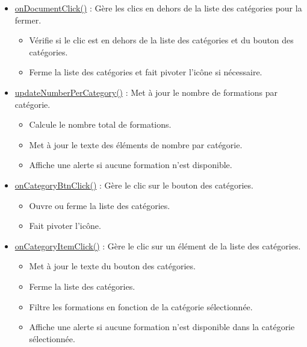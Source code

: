 \documentclass[a4paper,11pt]{article}
\begin{document}
\begin{enumerate}
\begin{enumerate}
\begin{itemize}
                                \item \underline{onDocumentClick()} : Gère les clics en dehors de la liste des catégories pour la fermer.
                                    \begin{itemize}
                                        \item Vérifie si le clic est en dehors de la liste des catégories et du bouton des catégories.
                                        \item Ferme la liste des catégories et fait pivoter l'icône si nécessaire.
                                    \end{itemize}
                                \item \underline{updateNumberPerCategory()} : Met à jour le nombre de formations par catégorie.
                                    \begin{itemize}
                                        \item Calcule le nombre total de formations.
                                        \item Met à jour le texte des éléments de nombre par catégorie.
                                        \item Affiche une alerte si aucune formation n'est disponible.
                                    \end{itemize}
                                \item \underline{onCategoryBtnClick()} : Gère le clic sur le bouton des catégories.
                                    \begin{itemize}
                                        \item Ouvre ou ferme la liste des catégories.
                                        \item Fait pivoter l'icône.
                                    \end{itemize}
                                \item \underline{onCategoryItemClick()} : Gère le clic sur un élément de la liste des catégories.
                                    \begin{itemize}
                                        \item Met à jour le texte du bouton des catégories.
                                        \item Ferme la liste des catégories. 
                                        \item Filtre les formations en fonction de la catégorie sélectionnée.
                                        \item Affiche une alerte si aucune formation n'est disponible dans la catégorie sélectionnée.
                                    \end{itemize}


\end{itemize}
\end{enumerate}
\end{enumerate}
\end{document}
